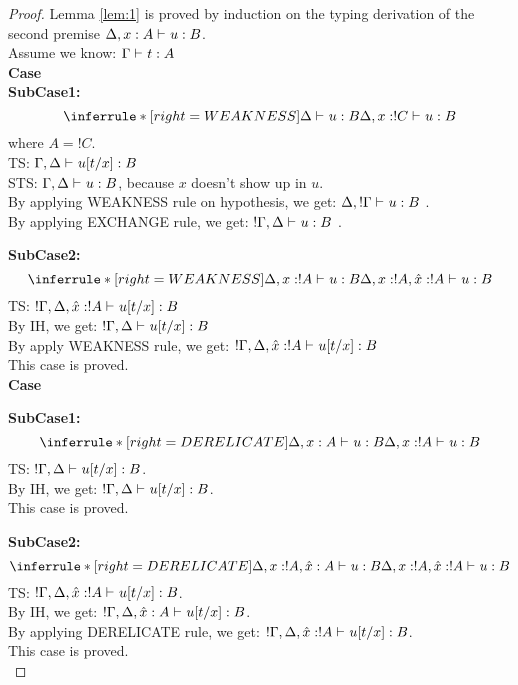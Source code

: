 \documentclass[titlepage]{article}
\begin{document}
\begin{proof}
Lemma \ref{lem:1} is proved by induction on the typing derivation of the second premise  $\Delta, x: A \mathrel{\vdash_{}^{} {u} : {B}}$. \\
   Assume we know: $ \Gamma \mathrel{\vdash_{}^{} {t} : { A}}$ \\
   
  \noindent \textbf{Case}\\
  \noindent \textbf{SubCase1:}
  \[
   \inferrule*[ right = WEAKNESS]
   {\Delta \jtype{}{}{u}{B}}
   {\Delta, x:!C \jtype{}{}{u}{B}}
  \]
  where $A = ! C$.\\
  TS: $ \Gamma, \Delta \mathrel{\vdash_{}^{} {u[t/x]} : {B}}$ \\
  STS: $ \Gamma, \Delta \mathrel{\vdash_{}^{} {u} : {B}}$, because $x$ doesn't show up in $u$. \\
  By applying WEAKNESS rule on hypothesis, we get: $\Delta, ! \Gamma \mathrel{\vdash_{}^{} {u} : {B}}$ .\\
  By applying EXCHANGE rule, we get: $! \Gamma, \Delta \mathrel{\vdash_{}^{} {u} : {B}}$ .\\

  \noindent \textbf{SubCase2:}
  \[
   \inferrule*[ right = WEAKNESS]
   {\Delta, x:!A \jtype{}{}{u}{B}}
   {\Delta, x:!A, \hat{x} : ! A \jtype{}{}{u}{B}}
  \]
  TS: $! \Gamma, \Delta, \hat{x} : !A \mathrel{\vdash_{}^{} {u[t/x]} : {B}}$ \\
  By IH, we get:
  $! \Gamma, \Delta \mathrel{\vdash_{}^{} {u[t/x]} : {B}}$\\
  By apply WEAKNESS rule, we get:
  $! \Gamma, \Delta, \hat{x} : ! A  \mathrel{\vdash_{}^{} {u[t/x]} : {B}}$\\
  This case is proved.\\

  \noindent \textbf{Case}

  \noindent \textbf{SubCase1:}
  \[
   \inferrule*[ right = DERELICATE ]
   {\Delta, x:A \jtype{}{}{u}{B}}
   {\Delta, x:!A \jtype{}{}{u}{B}}
  \]
  TS: $! \Gamma, \Delta \mathrel{\vdash_{}^{} {u[t/x]} : {B}}$. \\
  By IH, we get: $! \Gamma, \Delta \mathrel{\vdash_{}^{} {u[t/x]} : {B}}$. \\
  This case is proved.

  \noindent \textbf{SubCase2:}
  \[
   \inferrule*[ right = DERELICATE ]
   {\Delta, x:!A , \hat{x} : A\jtype{}{}{u}{B}}
   {\Delta, x:!A, \hat{x} : ! A \jtype{}{}{u}{B}}
  \]
  TS: $! \Gamma, \Delta, \hat{x} : ! A \mathrel{\vdash_{}^{} {u[t/x]} : {B}}$. \\
  By IH, we get: $! \Gamma, \Delta, \hat{x} : A \mathrel{\vdash_{}^{} {u[t/x]} : {B}}$. \\
  By applying DERELICATE rule, we get: $! \Gamma, \Delta, \hat{x} : ! A \mathrel{\vdash_{}^{} {u[t/x]} : {B}}$. \\
  This case is proved.\\


\end{proof}
\end{document}
